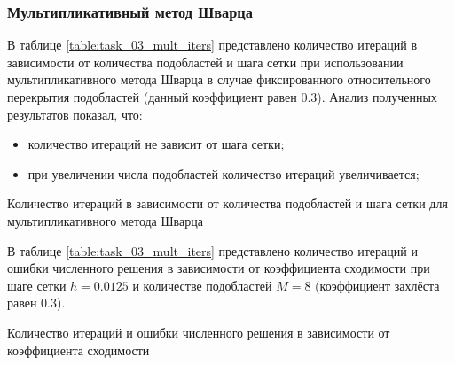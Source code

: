 \documentclass[a4paper]{article}
\begin{document}
\newpage

\subsubsection{Мультипликативный метод Шварца}

В таблице \ref{table:task_03_mult_iters} представлено количество итераций в зависимости от количества подобластей и шага сетки при использовании мультипликативного метода Шварца в случае фиксированного относительного перекрытия подобластей (данный коэффициент равен 0.3). Анализ полученных результатов показал, что:
\begin{itemize}
\item количество итераций не зависит от шага сетки;
\item при увеличении числа подобластей количество итераций увеличивается;
\end{itemize}

\begin{table}[h]
\caption{Количество итераций в зависимости от количества подобластей и шага сетки для мультипликативного метода Шварца}
\label{table:task_03_mult_iters}
\end{table}

В таблице \ref{table:task_03_mult_iters} представлено количество итераций и ошибки численного решения в зависимости от коэффициента сходимости при шаге сетки $h = 0.0125$ и количестве подобластей $M = 8$ (коэффициент захлёста равен 0.3).

\begin{table}[h]
\caption{Количество итераций и ошибки численного решения в зависимости от коэффициента сходимости}
\label{table:task_03_mult_errors_special}
\end{table}
\end{document}
